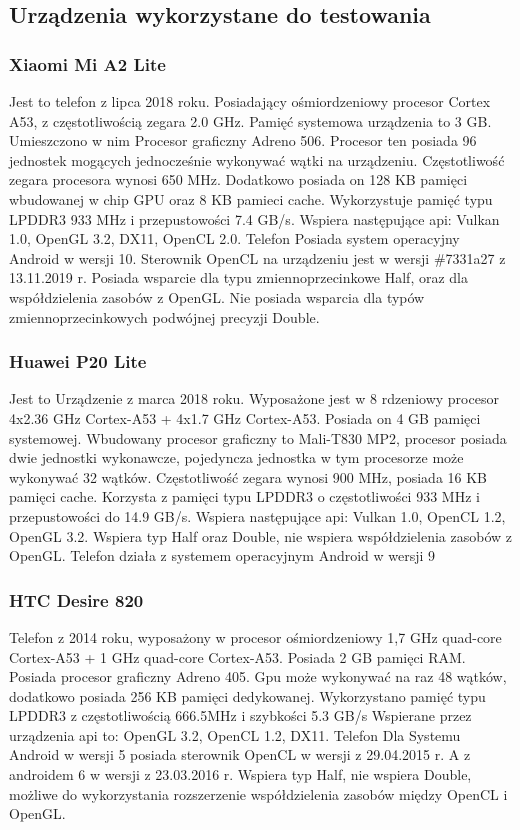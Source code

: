 	
\subsection[Urządzenia wykorzystane do testowania]{Urządzenia wykorzystane do testowania}
\subsubsection[Xiaomi Mi A2 Lite]{Xiaomi Mi A2 Lite}
Jest to telefon z lipca 2018 roku. Posiadający ośmiordzeniowy procesor Cortex A53, z częstotliwością zegara 2.0 GHz. Pamięć systemowa urządzenia to 3 GB. Umieszczono w nim Procesor graficzny Adreno 506. Procesor ten posiada 96 jednostek mogących jednocześnie wykonywać wątki na urządzeniu. Częstotliwość zegara procesora wynosi 650 MHz. Dodatkowo posiada on 128 KB pamięci wbudowanej w chip GPU oraz 8 KB pamieci cache. Wykorzystuje pamięć typu LPDDR3 933 MHz i przepustowości 7.4 GB/s. Wspiera następujące api: Vulkan 1.0, OpenGL 3.2, DX11, OpenCL 2.0. Telefon Posiada system operacyjny Android w wersji 10. Sterownik OpenCL na urządzeniu jest w wersji \#7331a27 z 13.11.2019 r. Posiada wsparcie dla typu zmiennoprzecinkowe Half, oraz dla współdzielenia zasobów z OpenGL. Nie posiada wsparcia dla typów zmiennoprzecinkowych podwójnej precyzji Double.
\subsubsection[Huawei P20 Lite]{Huawei P20 Lite}
Jest to Urządzenie z marca 2018 roku. Wyposażone jest w 8 rdzeniowy procesor 4x2.36 GHz Cortex-A53 + 4x1.7 GHz Cortex-A53. Posiada on 4 GB pamięci systemowej. Wbudowany procesor graficzny to Mali-T830 MP2, procesor posiada dwie jednostki wykonawcze, pojedyncza jednostka w tym procesorze może wykonywać 32 wątków. Częstotliwość zegara wynosi 900 MHz, posiada 16 KB pamięci cache. Korzysta z pamięci typu LPDDR3 o częstotliwości 933 MHz i przepustowości do 14.9 GB/s. Wspiera następujące api: Vulkan 1.0, OpenCL 1.2, OpenGL 3.2. Wspiera typ Half oraz Double, nie wspiera współdzielenia zasobów z OpenGL. Telefon działa z systemem operacyjnym Android w wersji 9
\subsubsection[HTC Desire 820]{HTC Desire 820}
Telefon z 2014 roku, wyposażony w procesor ośmiordzeniowy 1,7 GHz quad-core Cortex-A53 + 1 GHz quad-core Cortex-A53. Posiada 2 GB pamięci RAM. Posiada procesor graficzny Adreno 405. Gpu może wykonywać na raz 48 wątków, dodatkowo posiada 256 KB pamięci dedykowanej. Wykorzystano pamięć typu LPDDR3 z częstotliwością 666.5MHz i szybkości 5.3 GB/s Wspierane przez urządzenia api to: OpenGL 3.2, OpenCL 1.2, DX11. Telefon Dla Systemu Android w wersji 5 posiada sterownik OpenCL w wersji z 29.04.2015 r. A z androidem 6 w wersji z 23.03.2016 r. Wspiera typ Half, nie wspiera Double, możliwe do wykorzystania rozszerzenie współdzielenia zasobów między OpenCL i OpenGL.
